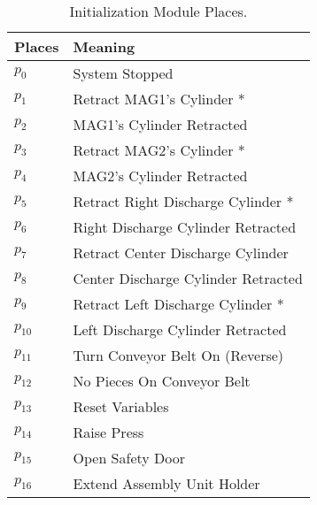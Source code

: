\begin{table}[htbp]
\caption{Initialization Module Places.}
\centering
\begin{tabular}{M{5cm}M{10cm}}
Places & Meaning\\
\hline
\hyperlink{partialNet:p0m11}{\hypertarget{partialTable:p0m1}{$p_{0}$}} & System Stopped\\
\hyperlink{partialNet:p11}{\hypertarget{partialTable:p1}{$p_{1}$}} & Retract MAG1's Cylinder *\\
\hyperlink{partialNet:p21}{\hypertarget{partialTable:p2}{$p_{2}$}} & MAG1's Cylinder Retracted\\
\hyperlink{partialNet:p31}{\hypertarget{partialTable:p3}{$p_{3}$}} & Retract MAG2's Cylinder *\\
\hyperlink{partialNet:p41}{\hypertarget{partialTable:p4}{$p_{4}$}} & MAG2's Cylinder Retracted\\
\hyperlink{partialNet:p51}{\hypertarget{partialTable:p5}{$p_{5}$}} & Retract Right Discharge Cylinder *\\
\hyperlink{partialNet:p61}{\hypertarget{partialTable:p6}{$p_{6}$}} & Right Discharge Cylinder Retracted\\
\hyperlink{partialNet:p71}{\hypertarget{partialTable:p7}{$p_{7}$}} & Retract Center Discharge Cylinder\\
\hyperlink{partialNet:p81}{\hypertarget{partialTable:p8}{$p_{8}$}} & Center Discharge Cylinder Retracted\\
\hyperlink{partialNet:p91}{\hypertarget{partialTable:p9}{$p_{9}$}} & Retract Left Discharge Cylinder *\\
\hyperlink{partialNet:p101}{\hypertarget{partialTable:p10}{$p_{10}$}} & Left Discharge Cylinder Retracted\\
\hyperlink{partialNet:p111}{\hypertarget{partialTable:p11}{$p_{11}$}} & Turn Conveyor Belt On (Reverse)\\
\hyperlink{partialNet:p121}{\hypertarget{partialTable:p12}{$p_{12}$}} & No Pieces On Conveyor Belt\\
\hyperlink{partialNet:p131}{\hypertarget{partialTable:p13}{$p_{13}$}} & Reset Variables\\
\hyperlink{partialNet:p141}{\hypertarget{partialTable:p14}{$p_{14}$}} & Raise Press\\
\hyperlink{partialNet:p151}{\hypertarget{partialTable:p15}{$p_{15}$}} & Open Safety Door\\
\hyperlink{partialNet:p161}{\hypertarget{partialTable:p16}{$p_{16}$}} & Extend Assembly Unit Holder\\

\end{tabular}
\end{table}
